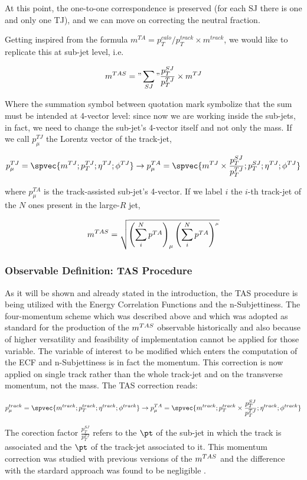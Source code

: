 At this point, the one-to-one correspondence is preserved (for each SJ there is one and only one TJ), and we can move on correcting the neutral fraction.

Getting inspired from the formula $m^{TA}=p_T^{calo}/p_T^{track}\times m^{track}$, we would like to replicate this at sub-jet level, i.e.

$$m^{TAS}="\sum_{SJ}"\frac{p_T^{SJ}}{p_T^{TJ}}\times m^{TJ}$$

Where the summation symbol between quotation mark symbolize that the sum must be intended at 4-vector level: since now we are working inside the sub-jets, in fact, we need to change the sub-jet's 4-vector itself and not only the mass. If we call $p_\mu^{TJ}$ the Lorentz vector of the track-jet, 

$$p_\mu^{TJ} = \spvec{m^{TJ};p_T^{TJ};\eta^{TJ};\phi^{TJ}} \to p_\mu^{TA}=\spvec{m^{TJ}\times\frac{p_T^{SJ}}{p_T^{TJ}} ;p_T^{SJ};\eta^{TJ};\phi^{TJ}} $$
 
where $p_\mu^{TA}$ is the track-assisted sub-jet's 4-vector. If we label $i$ the $i$-th track-jet of the $N$ ones present in the large-$R$ jet,

$$ m^{TAS}=\sqrt{\left(\sum_i^N p^{TA} \right)_\mu \left(\sum_i^N p^{TA} \right)^{_\mu}} $$

\subsubsection{Observable Definition: TAS Procedure}
\label{sec:tas}

As it will be shown and already stated in the introduction, the TAS procedure is being utilized with the Energy Correlation Functions and the n-Subjettiness. The four-momentum scheme which was described above and which was adopted as standard for the production of the $m^{TAS}$ observable historically and also because of higher versatility and feasibility of implementation cannot be applied for those variable. The variable of interest to be modified which enters the computation of the ECF and n-Subjettiness is in fact the momentum.
This correction is now applied on single track rather than the whole track-jet and on the transverse momentum, not the mass.
The TAS correction reads:

$$p_\mu^{track} = \spvec{m^{track};p_T^{track};\eta^{track};\phi^{track}} \to p_\mu^{TA}=\spvec{m^{track} ;p_T^{track} \times\frac{p_T^{SJ}}{p_T^{TJ}};\eta^{track};\phi^{track}}$$

The corection factor $\frac{p_T^{SJ}}{p_T^{TJ}}$ refers to the $\pt$ of the sub-jet in which the track is associated and the $\pt$ of the track-jet associated to it.
This momentum correction was studied with previous versions of the $m^{TAS}$ and the difference with the stardard approach was found to be negligible \cite{presentation}.


